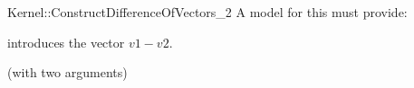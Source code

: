 \begin{ccRefFunctionObjectConcept}{Kernel::ConstructDifferenceOfVectors_2}
A model for this must provide:


            {introduces the vector $v1 - v2$.}

\ccRefines
{} (with two arguments)

\ccSeeAlso
{}\\

\end{ccRefFunctionObjectConcept}

